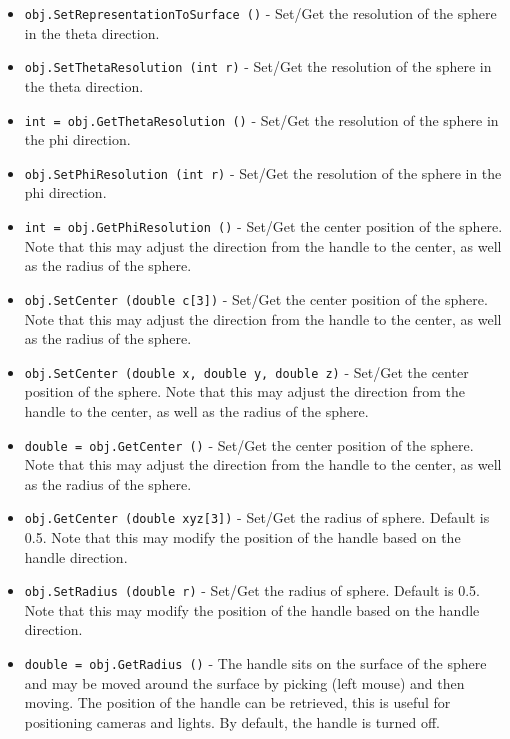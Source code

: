 \begin{itemize}
\item  \verb|obj.SetRepresentationToSurface ()| -  Set/Get the resolution of the sphere in the theta direction.

\item  \verb|obj.SetThetaResolution (int r)| -  Set/Get the resolution of the sphere in the theta direction.

\item  \verb|int = obj.GetThetaResolution ()| -  Set/Get the resolution of the sphere in the phi direction.

\item  \verb|obj.SetPhiResolution (int r)| -  Set/Get the resolution of the sphere in the phi direction.

\item  \verb|int = obj.GetPhiResolution ()| -  Set/Get the center position of the sphere. Note that this may
 adjust the direction from the handle to the center, as well as
 the radius of the sphere.

\item  \verb|obj.SetCenter (double c[3])| -  Set/Get the center position of the sphere. Note that this may
 adjust the direction from the handle to the center, as well as
 the radius of the sphere.

\item  \verb|obj.SetCenter (double x, double y, double z)| -  Set/Get the center position of the sphere. Note that this may
 adjust the direction from the handle to the center, as well as
 the radius of the sphere.

\item  \verb|double = obj.GetCenter ()| -  Set/Get the center position of the sphere. Note that this may
 adjust the direction from the handle to the center, as well as
 the radius of the sphere.

\item  \verb|obj.GetCenter (double xyz[3])| -  Set/Get the radius of sphere. Default is 0.5. Note that this may
 modify the position of the handle based on the handle direction.

\item  \verb|obj.SetRadius (double r)| -  Set/Get the radius of sphere. Default is 0.5. Note that this may
 modify the position of the handle based on the handle direction.

\item  \verb|double = obj.GetRadius ()| -  The handle sits on the surface of the sphere and may be moved around
 the surface by picking (left mouse) and then moving. The position
 of the handle can be retrieved, this is useful for positioning cameras
 and lights. By default, the handle is turned off.


\end{itemize}
